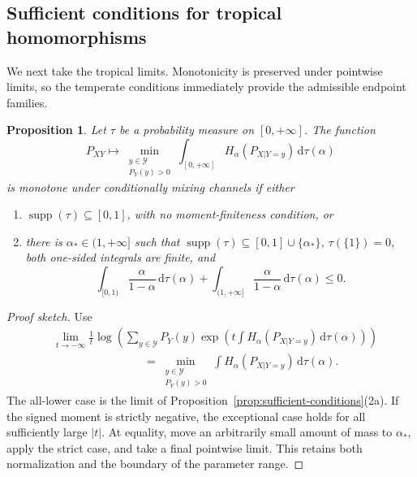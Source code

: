 \documentclass[aps,pra,11pt,onecolumn,nofootinbib,tightenlines]{revtex4-2}
\newtheorem{proposition}[theorem]{Proposition}
\theoremstyle{definition}
\def \d {\mathrm{d}}
\newcommand{\Y}{\mathcal{Y}}
\begin{document}
\subsection{Sufficient conditions for tropical homomorphisms}

We next take the tropical limits.  Monotonicity is preserved under pointwise
limits, so the temperate conditions immediately provide the admissible endpoint
families.

\begin{proposition}
\label{prop:sufficient-tropical}
Let $\tau$ be a probability measure on $[0,+\infty]$.  The function
\begin{equation}
\label{eq:TropicalForm}
P_{XY}\longmapsto
\min_{\substack{y\in\Y\\P_Y(y)>0}}
\int_{[0,+\infty]}H_\alpha(P_{X|Y=y})\,\d\tau(\alpha)
\end{equation}
is monotone under conditionally mixing channels if either
\begin{enumerate}[label=(\alph*)]
\item $\operatorname{supp}(\tau)\subseteq[0,1]$, with no moment-finiteness
condition, or
\item there is $\alpha_*\in(1,+\infty]$ such that
$\operatorname{supp}(\tau)\subseteq[0,1]\cup\{\alpha_*\}$,
$\tau(\{1\})=0$, both one-sided integrals are finite, and
\begin{equation}
\int_{[0,1)}\frac{\alpha}{1-\alpha}\,\d\tau(\alpha)
+\int_{(1,+\infty]}\frac{\alpha}{1-\alpha}\,\d\tau(\alpha)\leq0.
\end{equation}
\end{enumerate}
\end{proposition}

\begin{proof}[Proof sketch]
Use
\begin{align}
\label{eq:limit-tropical}
&\lim_{t\to-\infty}\frac1t\log\!\left(
\sum_{y\in\Y}P_Y(y)
\exp\!\left(t\int H_\alpha(P_{X|Y=y})\,\d\tau(\alpha)\right)
\right)\\
&\hspace{8em}=
\min_{\substack{y\in\Y\\P_Y(y)>0}}
\int H_\alpha(P_{X|Y=y})\,\d\tau(\alpha).
\end{align}
The all-lower case is the limit of Proposition~\ref{prop:sufficient-conditions}(2a).
If the signed moment is strictly negative, the exceptional case holds for all
sufficiently large $|t|$.  At equality, move an arbitrarily small amount of mass
to $\alpha_*$, apply the strict case, and take a final pointwise limit.  This
retains both normalization and the boundary of the parameter range.
\end{proof}
\end{document}
